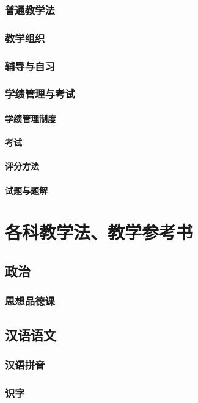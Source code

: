 \documentclass[UTF8]{../../ApplicationUniverse}
\begin{document}
        \subsubsection{普通教学法}
        \subsubsection{教学组织}
        \subsubsection{辅导与自习}
        \subsubsection{学绩管理与考试}
            \paragraph{学绩管理制度}
            \paragraph{考试}
            \paragraph{评分方法}
            \paragraph{试题与题解}
\section{各科教学法、教学参考书}
    \subsection{政治}
        \subsubsection{思想品德课}
    \subsection{汉语语文}
        \subsubsection{汉语拼音}
        \subsubsection{识字}
\end{document}
